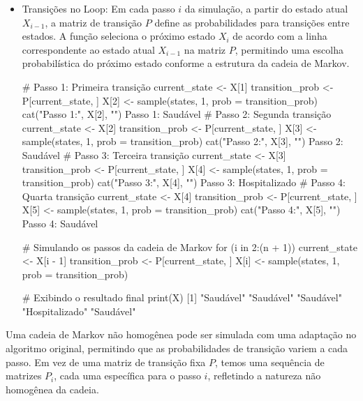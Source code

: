 \documentclass[12pt]{article}
\theoremstyle{break}
\begin{document}
\begin{itemize}
   
   \item Transições no Loop: Em cada passo \( i \) da simulação, a partir do estado atual \( X_{i-1} \), a matriz de transição \( P \) define as probabilidades para transições entre estados. A função seleciona o próximo estado \( X_i \) de acordo com a linha correspondente ao estado atual \( X_{i-1} \) na matriz \( P \), permitindo uma escolha probabilística do próximo estado conforme a estrutura da cadeia de Markov. 



\begin{RCodeBox}

# Passo 1: Primeira transição
current_state <- X[1]
transition_prob <- P[current_state, ]
X[2] <- sample(states, 1, prob = transition_prob)
cat("Passo 1:", X[2], "\n")
Passo 1: Saudável 
# Passo 2: Segunda transição
current_state <- X[2]
transition_prob <- P[current_state, ]
X[3] <- sample(states, 1, prob = transition_prob)
cat("Passo 2:", X[3], "\n")
Passo 2: Saudável 
# Passo 3: Terceira transição
current_state <- X[3]
transition_prob <- P[current_state, ]
X[4] <- sample(states, 1, prob = transition_prob)
cat("Passo 3:", X[4], "\n")
Passo 3: Hospitalizado 
# Passo 4: Quarta transição
current_state <- X[4]
transition_prob <- P[current_state, ]
X[5] <- sample(states, 1, prob = transition_prob)
cat("Passo 4:", X[5], "\n")
Passo 4: Saudável 

\end{RCodeBox}




\begin{RCodeBox}

# Simulando os passos da cadeia de Markov
for (i in 2:(n + 1)) {
  current_state <- X[i - 1]
  transition_prob <- P[current_state, ]
  X[i] <- sample(states, 1, prob = transition_prob)
}

# Exibindo o resultado final
print(X)
[1] "Saudável"      "Saudável"      "Saudável"      "Hospitalizado" "Saudável" 


\end{RCodeBox}

\end{itemize}







Uma cadeia de Markov não homogênea pode ser simulada com uma adaptação no algoritmo original, permitindo que as probabilidades de transição variem a cada passo. Em vez de uma matriz de transição fixa \( P \), temos uma sequência de matrizes \( P_i \), cada uma específica para o passo \( i \), refletindo a natureza não homogênea da cadeia.
\end{document}

